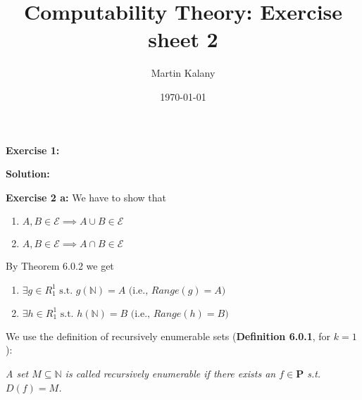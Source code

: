 \documentclass [11pt]{article}
\title{Computability Theory: Exercise sheet 2}
\author{Martin Kalany}
\date{\today}
\newcommand{\E}{\ensuremath{\mathcal{E}}}
\newcommand{\N}{\ensuremath{\mathbb{N}}}
\begin{document}
\maketitle

\bigskip
\noindent
\textbf{Exercise 1:}

\noindent
\textbf{Solution:}

\bigskip
\noindent
\textbf{Exercise 2 a:} 
We have to show that
\begin{enumerate}[label={\alph*)}] 
 \item $A, B \in \E \implies A\cup B \in \E$ 
 \item $A, B \in \E \implies A\cap B \in \E$ 
\end{enumerate}
By Theorem 6.0.2 we get 
\begin{enumerate}[label={\alph*)}] 
 \item $\exists g \in R_1^1 \text{ s.t.\ } g(\N) = A \text{ (i.e., } Range(g) = A)$
 \item $\exists h \in R_1^1 \text{ s.t.\ } h(\N) = B\text{ (i.e., } Range(h) = B)$
\end{enumerate}
We use the definition of recursively enumerable sets (\textbf{Definition 6.0.1}, for $k=1$):

\noindent
\emph{A set $M \subseteq \N$ is called recursively enumerable if there exists an $f \in \textbf{P}$ s.t.\ $D(f) = M$.}
\end{document}
